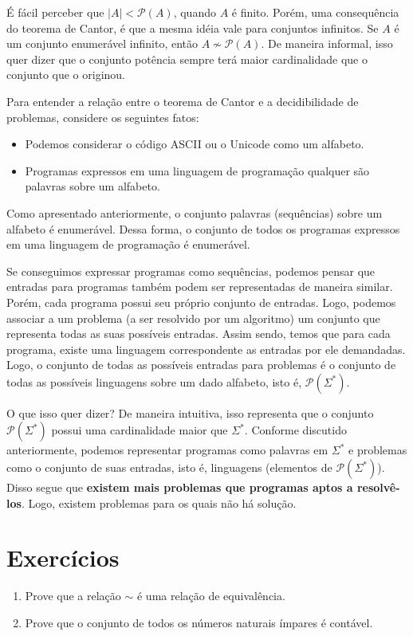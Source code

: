 \documentclass[a4paper]{article}
\theoremstyle{definition}
\begin{document}
  É fácil perceber que $|A| < \mathcal{P}(A)$, quando $A$ é finito. Porém, uma
  consequência do teorema de Cantor, é que a mesma idéia vale para conjuntos
  infinitos. Se $A$ é um conjunto enumerável infinito, então
  $A \not\sim \mathcal{P}(A)$. De maneira informal, isso quer dizer que o
  conjunto potência sempre terá maior cardinalidade que o conjunto que o
  originou.
  
  Para entender a relação entre o teorema de Cantor e a decidibilidade de
  problemas, considere os seguintes fatos:
  \begin{itemize}
     \item Podemos considerar o código ASCII ou o Unicode como um alfabeto.
     \item Programas expressos em uma linguagem de programação qualquer são
           palavras sobre um alfabeto.
  \end{itemize}
  Como apresentado anteriormente, o conjunto palavras (sequências) sobre um
  alfabeto é enumerável. Dessa forma, o conjunto de todos os programas expressos
  em uma linguagem de programação é enumerável.

  Se conseguimos expressar programas como sequências, podemos pensar que
  entradas para programas também podem ser representadas de maneira similar.
  Porém, cada programa possui seu próprio conjunto de entradas. Logo, podemos
  associar a um problema (a ser resolvido por um algoritmo) um conjunto que
  representa todas as suas possíveis entradas. Assim sendo, temos que para cada
  programa, existe uma linguagem correspondente as entradas por ele demandadas.
  Logo, o conjunto de todas as possíveis entradas para problemas é o conjunto
  de todas as possíveis linguagens sobre um dado alfabeto, isto é,
  $\mathcal{P}(\Sigma^*)$.

  
  O que isso quer dizer? De maneira intuitiva, isso representa que o conjunto
  $\mathcal{P}(\Sigma^*)$ possui uma cardinalidade maior que $\Sigma^*$.
  Conforme discutido anteriormente, podemos representar programas como palavras
  em $\Sigma^*$ e problemas como o conjunto de suas entradas, isto é,
  linguagens (elementos de $\mathcal{P}(\Sigma^*)$). Disso segue que
  \textbf{existem mais problemas que programas aptos a resolvê-los}. Logo,
  existem problemas para os quais não há solução.
  
  \section{Exercícios}

  \begin{enumerate}
    \item Prove que a relação $\sim$ é uma relação de equivalência.
    \item Prove que o conjunto de todos os números naturais ímpares é contável.
  \end{enumerate}
\end{document}
